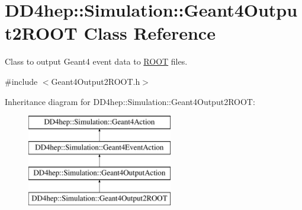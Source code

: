 \hypertarget{class_d_d4hep_1_1_simulation_1_1_geant4_output2_r_o_o_t}{}\section{D\+D4hep\+:\+:Simulation\+:\+:Geant4\+Output2\+R\+O\+OT Class Reference}
\label{class_d_d4hep_1_1_simulation_1_1_geant4_output2_r_o_o_t}


Class to output Geant4 event data to \hyperlink{namespace_r_o_o_t}{R\+O\+OT} files.  




{\ttfamily \#include $<$Geant4\+Output2\+R\+O\+O\+T.\+h$>$}

Inheritance diagram for D\+D4hep\+:\+:Simulation\+:\+:Geant4\+Output2\+R\+O\+OT\+:\begin{figure}[H]
\begin{center}
\leavevmode
\includegraphics[height=4.000000cm]{class_d_d4hep_1_1_simulation_1_1_geant4_output2_r_o_o_t}
\end{center}
\end{figure}
